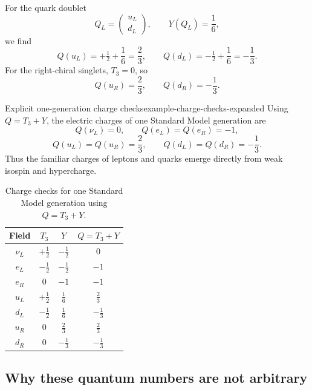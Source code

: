 \documentclass[11pt,a4paper]{article}
\newcommand{\half}{\tfrac12}
\begin{document}
For the quark doublet
\[
Q_L=\begin{pmatrix}u_L\\ d_L\end{pmatrix},
\qquad Y(Q_L)=\frac16,
\]
we find
\begin{equation}
Q(u_L)=+\half+\frac16=\frac23,
\qquad
Q(d_L)=-\half+\frac16=-\frac13.
\label{eq:quark-doublet-charges-expanded}
\end{equation}
For the right-chiral singlets, \(T_3=0\), so
\begin{equation}
Q(u_R)=\frac23,
\qquad
Q(d_R)=-\frac13.
\label{eq:quark-singlet-charges-expanded}
\end{equation}

\begin{examplebox}{Explicit one-generation charge checks}{example-charge-checks-expanded}
Using \(Q=T_3+Y\), the electric charges of one Standard Model generation are
\[
Q(\nu_L)=0,
\qquad
Q(e_L)=Q(e_R)=-1,
\]
\[
Q(u_L)=Q(u_R)=\frac23,
\qquad
Q(d_L)=Q(d_R)=-\frac13.
\]
Thus the familiar charges of leptons and quarks emerge directly from weak isospin and hypercharge.
\end{examplebox}

\begin{table}[H]
\centering
\caption{Charge checks for one Standard Model generation using \(Q=T_3+Y\).}
\label{tab:charge-checks-clean}
\begin{tabular}{cccc}
\toprule
Field & \(T_3\) & \(Y\) & \(Q=T_3+Y\) \\
\midrule
\(\nu_L\) & \(+\frac12\) & \(-\frac12\) & \(0\) \\
\(e_L\) & \(-\frac12\) & \(-\frac12\) & \(-1\) \\
\(e_R\) & \(0\) & \(-1\) & \(-1\) \\
\(u_L\) & \(+\frac12\) & \(\frac16\) & \(\frac23\) \\
\(d_L\) & \(-\frac12\) & \(\frac16\) & \(-\frac13\) \\
\(u_R\) & \(0\) & \(\frac23\) & \(\frac23\) \\
\(d_R\) & \(0\) & \(-\frac13\) & \(-\frac13\) \\
\bottomrule
\end{tabular}
\end{table}




\subsection{Why these quantum numbers are not arbitrary}
\end{document}
